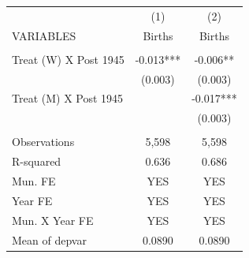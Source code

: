 \begin{tabular}{lcc} \hline
 & (1) & (2) \\
VARIABLES & Births & Births \\ \hline
 &  &  \\
Treat (W) X Post 1945 & -0.013*** & -0.006** \\
 & (0.003) & (0.003) \\
Treat (M) X Post 1945 &  & -0.017*** \\
 &  & (0.003) \\
 &  &  \\
Observations & 5,598 & 5,598 \\
R-squared & 0.636 & 0.686 \\
Mun. FE & YES & YES \\
Year FE & YES & YES \\
Mun. X Year FE & YES & YES \\
 Mean of depvar & 0.0890 & 0.0890 \\ \hline
\end{tabular}

